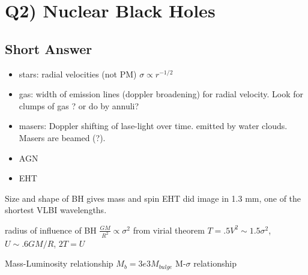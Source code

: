 \documentclass[\main/main.tex]{subfiles}
\begin{document}
	





\section{Q2) Nuclear Black Holes} %
\label{sec:q2_nuclear_black_holes}

    \subsection{Short Answer}
        \begin{itemize}
            \item stars: radial velocities (not PM) $\sigma \propto r^{-1/2}$
            \item gas: width of emission lines (doppler broadening) for radial velocity. Look for clumps of gas ? or do by annuli?
            \item masers: Doppler shifting of lase-light over time. emitted by water clouds. Masers are beamed (?).
            \item AGN
            \item EHT
        \end{itemize}{}
        
        Size and shape of BH gives mass and spin
        EHT did image in 1.3 mm, one of the shortest VLBI wavelengths.
        
        radius of influence of BH $\frac{GM}{R^2} \propto \sigma^2$
        from virial theorem $T=.5V^2 \sim 1.5 \sigma^2$, $U\sim .6 GM/R$, $2T=U$
        
        Mass-Luminosity relationship $M_b = 3e3 M_{bulge}$
        M-$\sigma$ relationship
    
    
\end{document}

